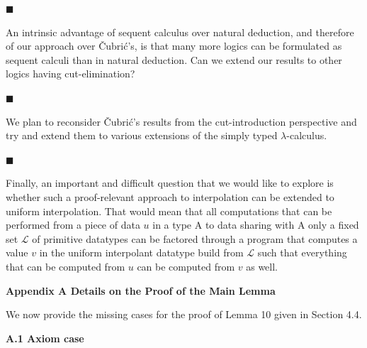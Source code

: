 \documentclass[10pt,a4paper]{article}
\begin{document}
 
 
\par\noindent  $\blacksquare$ 
 
An intrinsic advantage of sequent calculus over natural deduction, and therefore of our approach over Čubrić’s, is that many more logics can be formulated as sequent calculi than in natural deduction. Can we extend our results to other logics having cut-elimination?\par
 
 
 
\par\noindent  $\blacksquare$ 
 
We plan to reconsider Čubrić’s results from the cut-introduction perspective and try and extend them to various extensions of the simply typed $\lambda$-calculus.\par
 
 
 
\par\noindent  $\blacksquare$ 
 
Finally, an important and difficult question that we would like to explore is whether such a proof-relevant approach to interpolation can be extended to uniform interpolation. That would mean that all computations that can be performed from a piece of data $u$ in a type A to data sharing with A only a fixed set $\mathcal{L}$ of primitive datatypes can be factored through a program that computes a value $v$ in the uniform interpolant datatype build from $\mathcal{L}$ such that everything that can be computed from $u$ can be computed from $v$ as well.\par
 
 
  
 


 
\par\medskip\noindent\textbf{Appendix A  Details on the Proof of the Main Lemma}\par
 
 
We now provide the missing cases for the proof of Lemma 10 given in Section 4.4.\par
 
 
 
\par\medskip\noindent\textbf{A.1 Axiom case}\par
 
\end{document}
